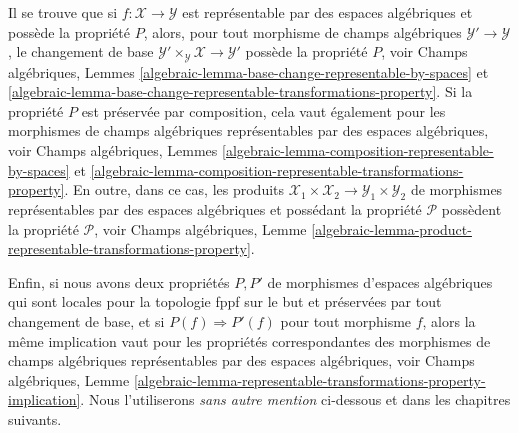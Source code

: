 \medskip\noindent
Il se trouve que si $f : \mathcal{X} \to \mathcal{Y}$ est représentable
par des espaces algébriques et possède la propriété $P$, alors, pour tout morphisme de champs algébriques
$\mathcal{Y}' \to \mathcal{Y}$, le changement de base
$\mathcal{Y}' \times_\mathcal{Y} \mathcal{X} \to \mathcal{Y}'$
possède la propriété $P$, voir
Champs algébriques,
Lemmes \ref{algebraic-lemma-base-change-representable-by-spaces} et
\ref{algebraic-lemma-base-change-representable-transformations-property}.
Si la propriété $P$ est préservée par composition, cela vaut
également pour les morphismes de champs algébriques représentables par
des espaces algébriques, voir
Champs algébriques,
Lemmes \ref{algebraic-lemma-composition-representable-by-spaces} et
\ref{algebraic-lemma-composition-representable-transformations-property}.
En outre, dans ce cas, les produits
$\mathcal{X}_1 \times \mathcal{X}_2 \to \mathcal{Y}_1 \times \mathcal{Y}_2$
de morphismes représentables par des espaces algébriques et possédant la propriété $\mathcal{P}$
possèdent la propriété $\mathcal{P}$, voir
Champs algébriques, Lemme
\ref{algebraic-lemma-product-representable-transformations-property}.

\medskip\noindent
Enfin, si nous avons deux propriétés $P, P'$ de morphismes d'espaces algébriques
qui sont locales pour la topologie fppf sur le but et préservées par tout changement de base,
et si $P(f) \Rightarrow P'(f)$ pour tout morphisme $f$, alors la même
implication vaut pour les propriétés correspondantes des morphismes de champs algébriques
représentables par des espaces algébriques, voir
Champs algébriques, Lemme
\ref{algebraic-lemma-representable-transformations-property-implication}.
Nous l'utiliserons {\it sans autre mention} ci-dessous et dans les
chapitres suivants.

